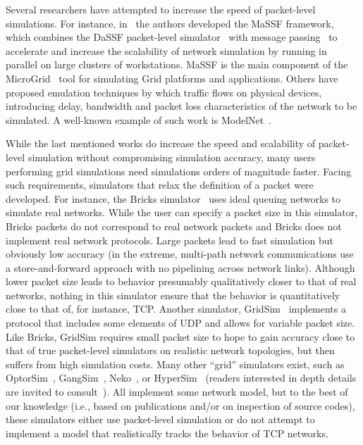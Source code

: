 \documentclass{sig-alternate}
\begin{document}
Several researchers have attempted to increase the speed of
packet-level simulations. For instance, in~\cite{REF_16} the authors
developed the MaSSF framework, which combines the DaSSF packet-level
simulator~\cite{REF_5} with message passing~\cite{REF_33} to
accelerate and increase the scalability of network simulation by
running in parallel on large clusters of workstations. MaSSF is the
main component of the MicroGrid~\cite{REF_34} tool for simulating Grid
platforms and applications. Others have proposed emulation techniques
by which traffic flows on physical devices, introducing delay, bandwidth
and packet loss characteristics of the network to be simulated. A
well-known example of such work is ModelNet~\cite{REF_38}.


While the last mentioned works do increase the speed and scalability of
packet-level simulation without compromising simulation accuracy, many
users performing grid simulations need simulations orders of magnitude
faster. Facing such requirements, simulators that relax the
definition of a packet were developed. For instance, the Bricks
simulator~\cite{REF_36} uses ideal queuing networks to simulate real
networks. While the user can specify a packet size in this simulator,
Bricks packets do not correspond to real network packets and Bricks
does not implement real network protocols. Large packets lead to fast
simulation but obviously low accuracy (in the extreme, multi-path
network communications use a store-and-forward approach with no
pipelining across network links). Although lower packet size leads to
behavior presumably qualitatively closer to that of real networks,
nothing in this simulator ensure that the behavior is quantitatively
close to that of, for instance, TCP. Another simulator,
GridSim~\cite{REF_35} implements a protocol that includes some
elements of UDP and allows for variable packet size. Like Bricks,
GridSim requires small packet size to hope to gain accuracy close to
that of true packet-level simulators on realistic network topologies,
but then suffers from high simulation costs. Many other ``grid''
simulators exist, such as OptorSim~\cite{REF_2},
GangSim~\cite{REF_7}, Neko~\cite{REF_25}, or
HyperSim~\cite{REF_27} (readers interested in depth details are invited to consult~\cite{REF_28}). All
implement some network model, but to the best of our knowledge (i.e.,
based on publications and/or on inspection of source codes), these
simulators either use packet-level simulation or do not attempt to
implement a model that realistically tracks the behavior of TCP
networks.
\end{document}
